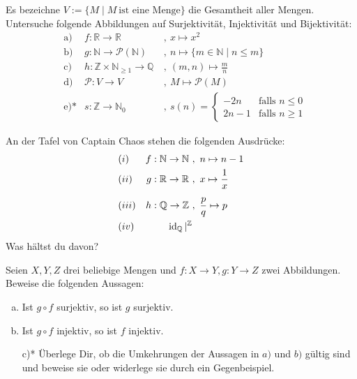 \begin{aufg}
Es bezeichne $V:= \{M \mid M\ \text{ist eine Menge} \}$ die Gesamtheit aller Mengen. Untersuche folgende Abbildungen auf Surjektivität, Injektivität und Bijektivität:
\begin{align*}
 &\text{a)} & f: \mathbb{R} \to \mathbb{R} \ &,\ x \mapsto x^2 \\
 &\text{b)} & g: \mathbb{N} \to \mathcal{P}(\mathbb{N}) \ &,\ n \mapsto \lbrace m \in \mathbb{N}\mid n\leq m \rbrace \\
 & \text{c)} & h:\mathbb{Z} \times \mathbb{N}_{\geq 1} \to \mathbb{Q}\ &,\ (m,n) \mapsto \frac{m}{n} \\[0.5em]
  &  \text{d)} & \mathcal{P} : V\to V \ &,\ M \mapsto \mathcal{P}(M) \\[0.5em]
  &\text{e)*} & s:\mathbb{Z} \to \mathbb{N}_0\ &,\ s(n)= \begin{cases}
	-2n & \text{falls } n\leq 0 \\
	2n-1 & \text{falls } n\geq 1
    \end{cases}
\end{align*}
\end{aufg}






\begin{aufg}[Wohldefiniertheit]
An der Tafel von Captain Chaos stehen die folgenden Ausdrücke:
\begin{align*}
& (i) & f: \mathbb{N} \to \mathbb{N}\ &,\ n \mapsto n-1 \\
& (ii) & g:\mathbb{R} \to \mathbb{R} \ &,\ x \mapsto \frac{1}{x} \\[0.5em]
& (iii) & h:\mathbb{Q} \to \mathbb{Z} \ &,\ \frac{p}{q} \mapsto p \\
& (iv) & \operatorname{id}_{\mathbb Q} \vert^{\mathbb Z}
\end{align*}
Was hältst du davon?
\end{aufg}





\begin{aufg}
\label{bijektiviso}
Seien $X,Y,Z$ drei beliebige Mengen und $f:X \to Y, g:Y \to Z$ zwei Abbildungen. Beweise die folgenden Aussagen:
\begin{enumerate}[a)]
 \item Ist $g \circ f$ surjektiv, so ist $g$ surjektiv.
 \item Ist $g \circ f$ injektiv, so ist $f$ injektiv.
 \item[c)*] Überlege Dir, ob die Umkehrungen der Aussagen in $a)$ und $b)$ gültig sind und beweise sie oder widerlege sie durch ein Gegenbeispiel.
\end{enumerate}
\end{aufg}





